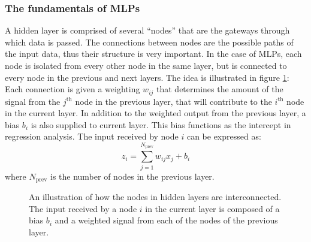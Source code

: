 \documentclass[nofootinbib,reprint,english]{revtex4-1}
\begin{document}
\subsubsection{The fundamentals of MLPs}
A hidden layer is comprised of several ``nodes'' that are the gateways through which data is passed. The connections between nodes are the possible paths of the input data, thus their structure is very important. In the case of MLPs, each node is isolated from every other node in the same layer, but is connected to every node in the previous and next layers. The idea is illustrated in figure \ref{fig:node_connections}: Each connection is given a weighting \(w_{ij}\) that determines the amount of the signal from the \(j^\text{th}\) node in the previous layer, that will contribute to the \(i^\text{th}\) node in the current layer. In addition to the weighted output from the previous layer, a bias \(b_i\) is also supplied to current layer. This bias functions as the intercept in regression analysis. The input received by node \(i\) can be expressed as:
\begin{equation}
z_i=\sum_{j=1}^{N_\text{prev}}w_{ij}x_j+b_i
\end{equation}
where \(N_\text{prev}\) is the number of nodes in the previous layer.

\begin{figure}
\centering
{}
\caption{An illustration of how the nodes in hidden layers are interconnected. The input received by a node \(i\) in the current layer is composed of a bias \(b_i\) and a weighted signal from each of the nodes of the previous layer.}\label{fig:node_connections}
\end{figure}
\end{document}
